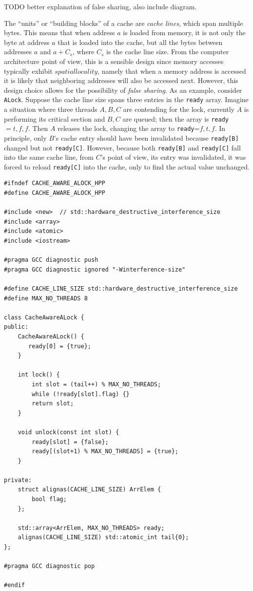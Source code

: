 TODO better explanation of false sharing, also include diagram.
\begin{definition}
    The ``units'' or ``building blocks'' of a cache are \textit{cache lines}, which span multiple bytes. This means that when address $a$ is loaded from memory, it is not only the byte at address $a$ that is loaded into the cache, but all the bytes between addresses $a$ and $a+C_s$, where $C_s$ is the cache line size. From the computer architecture point of view, this is a sensible design since memory accesses typically exhibit $spatial locality$, namely that when a memory address is accessed it is likely that neighboring addresses will also be accessed next. However, this design choice allows for the possibility of \textit{false sharing}. As an example, consider \verb|ALock|. Suppose the cache line size spans three entries in the \verb|ready| array. Imagine a situation where three threads $A,B,C$ are contending for the lock, currently $A$ is performing its critical section and $B,C$ are queued; then the array is \verb|ready|$={t,f,f}$. Then $A$ releases the lock, changing the array to \verb|ready|=${f,t,f}$. In principle, only $B$'s cache entry should have been invalidated because \verb|ready[B]| changed but not \verb|ready[C]|. However, because both \verb|ready[B]| and \verb|ready[C]| fall into the same cache line, from $C$'s point of view, its entry was invalidated, it was forced to reload \verb|ready[C]| into the cache, only to find the actual value unchanged.
\end{definition}

\makebox[\linewidth]{\rule{17cm}{0.4pt}}
{\centering \label{code:Alock}
\begin{verbatim}
#ifndef CACHE_AWARE_ALOCK_HPP
#define CACHE_AWARE_ALOCK_HPP

#include <new>  // std::hardware_destructive_interference_size
#include <array>
#include <atomic>
#include <iostream>

#pragma GCC diagnostic push
#pragma GCC diagnostic ignored "-Winterference-size"

#define CACHE_LINE_SIZE std::hardware_destructive_interference_size
#define MAX_NO_THREADS 8

class CacheAwareALock {
public:
    CacheAwareALock() {
       ready[0] = {true};
    }

    int lock() {
        int slot = (tail++) % MAX_NO_THREADS;
        while (!ready[slot].flag) {}
        return slot;
    }

    void unlock(const int slot) {
        ready[slot] = {false};
        ready[(slot+1) % MAX_NO_THREADS] = {true};
    }

private:
    struct alignas(CACHE_LINE_SIZE) ArrElem {
        bool flag;
    };

    std::array<ArrElem, MAX_NO_THREADS> ready;
    alignas(CACHE_LINE_SIZE) std::atomic_int tail{0}; 
};

#pragma GCC diagnostic pop

#endif
\end{verbatim}
\makebox[\linewidth]{\rule{17cm}{0.4pt}}
}

